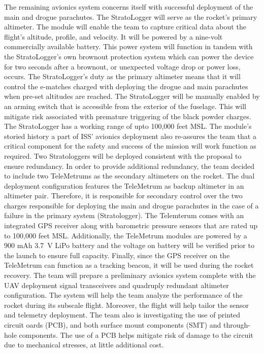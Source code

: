 The remaining avionics system concerns itself with successful deployment of the main and drogue parachutes. The StratoLogger will serve as the rocket’s primary altimeter. The module will enable the team to capture critical data about the flight’s altitude, profile, and velocity. It will be powered by a nine-volt commercially available battery. This power system will function in tandem with the StratoLogger’s own brownout protection system which can power the device for two seconds after a brownout, or unexpected voltage drop or power loss, occurs. The StratoLogger's duty as the primary altimeter means that it will control the e-matches charged with deploying the drogue and main parachutes when pre-set altitudes are reached. The StratoLogger will be manually enabled by an arming switch that is accessible from the exterior of the fuselage. This will mitigate risk associated with premature triggering of the black powder charges. The StratoLogger has a working range of upto 100,000 feet MSL. The module’s storied history a part of ISS’ avionics deployment also re-assures the team that a critical component for the safety and success of the mission will work function as required. Two Stratologgers will be deployed consistent with the proposal to ensure redundancy. 
In order to provide additional redundancy, the team decided to include two TeleMetrums as the secondary altimeters on the rocket. The dual deployment configuration features the TeleMetrum as backup altimeter in an altimeter pair. Therefore, it is responsible for secondary control over the two charges responsible for deploying the main and drogue parachutes in the case of a failure in the primary system (Stratologger). The Telemterum comes with an integrated GPS receiver along with barometric pressure sensors that are rated up to 100,000 feet MSL. Additionally, the TeleMetrum modules are powered by a 900 mAh \SI{3.7}{\volt} LiPo battery and the voltage on battery will be verified prior to the launch to ensure full capacity. Finally, since the GPS receiver on the TeleMetrum can function as a tracking beacon, it will be used during the rocket recovery. 
	The team will prepare a preliminary avionics system complete with the UAV deployment signal transceivers and quadruply redundant altimeter configuration. The system will help the team analyze the performance of the rocket during its subscale flight. Moreover, the flight will help tailor the sensor and telemetry deployment. The team also is investigating the use of printed circuit oards (PCB), and both surface mount components (SMT) and through-hole components. The use of a PCB helps mitigate risk of damage to the circuit due to mechanical stresses, at little additional cost.

